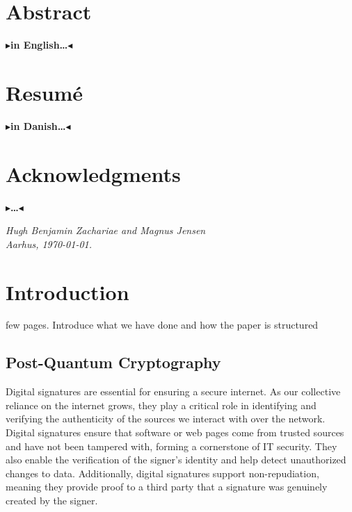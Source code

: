 \documentclass[11pt]{report}
\theoremstyle{definition}
\theoremstyle{plain}
\newcommand{\todo}[1]{{\color[rgb]{.5,0,0}\textbf{$\blacktriangleright$#1$\blacktriangleleft$}}}
\begin{document}
\pagestyle{plain}
\chapter*{Abstract}

\todo{in English\dots}

\chapter*{Resum\'e}

\todo{in Danish\dots}

\chapter*{Acknowledgments}

\todo{\dots}

\vspace{2ex}
\begin{flushright}
  \emph{Hugh Benjamin Zachariae and Magnus Jensen}\\
  \emph{Aarhus, \today.}
\end{flushright}

\tableofcontents
\cleardoublepage
{}
\setcounter{secnumdepth}{3}


\chapter{Introduction}\label{ch:intro}

few pages. Introduce what we have done and how the paper is structured

\section{Post-Quantum Cryptography}\label{sec:quantum}

Digital signatures are essential for ensuring a secure internet. As our collective reliance on the internet grows, they play a critical role in identifying and verifying the authenticity of the sources we interact with over the network. Digital signatures ensure that software or web pages come from trusted sources and have not been tampered with, forming a cornerstone of IT security. They also enable the verification of the signer's identity and help detect unauthorized changes to data. Additionally, digital signatures support non-repudiation, meaning they provide proof to a third party that a signature was genuinely created by the signer.
\end{document}

